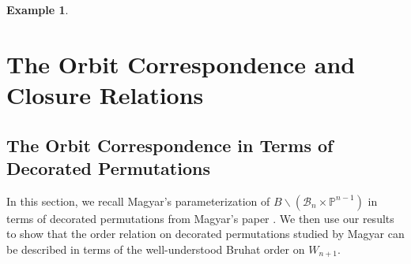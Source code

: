 \documentclass[12pt]{amsart}
\numberwithin{equation}{section}
\newtheorem{exam}[thm]{Example}
\newcommand{\cW}{{ W}}
\newcommand{\fgl}{\mathfrak{gl}}
\newcommand{\B}{\mathcal{B}}
\begin{document}
\begin{exam}

 

\end{exam}
 
 
 \section{The Orbit Correspondence and Closure Relations}\label{s:global}
 \subsection{The Orbit Correspondence in Terms of Decorated Permutations}
 In this section, we recall Magyar's parameterization of $B\backslash (\B_{n}\times\mathbb{P}^{n-1})$ in terms of decorated permutations from Magyar's paper \cite{Magyar}.  We then use our results to show that the order relation on decorated permutations studied by Magyar can be described in terms of the well-understood Bruhat order on $\cW_{n+1}.$

 
\end{document}
